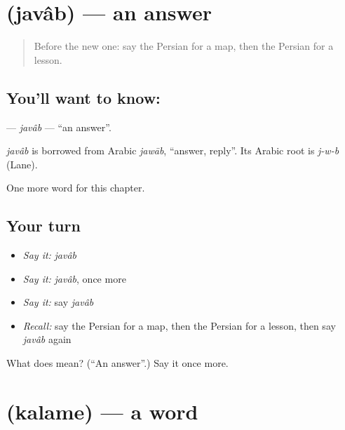 \section[\texorpdfstring{\fa{جواب} (javâb)}{جواب (javâb)}]{ (javâb) — an answer}

\label{lesson:FA-C50-javab}



\begin{quote}
Before the new one: say the Persian for a map, then the Persian for a lesson.
\end{quote}

\subsection*{You'll want to know: }
\textbf{} — \emph{javâb} — \textquotedblleft{}an answer\textquotedblright{}.

\begin{cousinweb}
\emph{javâb} is borrowed from Arabic \emph{jawāb}, \textquotedblleft{}answer, reply\textquotedblright{}. Its Arabic root is \emph{j-w-b} (Lane).
\end{cousinweb}

\begin{grammarlens}[title={What you've built}]
One more word for this chapter.
\end{grammarlens}

\subsection*{Your turn}
\begin{itemize}
\raggedright
  \item \emph{Say it:} \emph{javâb}
  \item \emph{Say it:} \emph{javâb}, once more
  \item \emph{Say it:} say \emph{javâb}
  \item \emph{Recall:} say the Persian for a map, then the Persian for a lesson, then say \emph{javâb} again
\end{itemize}

\begin{tcolorbox}[breakable,colback=teal!4,colframe=teal!35!black,title={Before you move on}]
What does  mean? (\textquotedblleft{}An answer\textquotedblright{}.) Say it once more.
\end{tcolorbox}
\section[\texorpdfstring{\fa{کلمه} (kalame)}{کلمه (kalame)}]{ (kalame) — a word}

